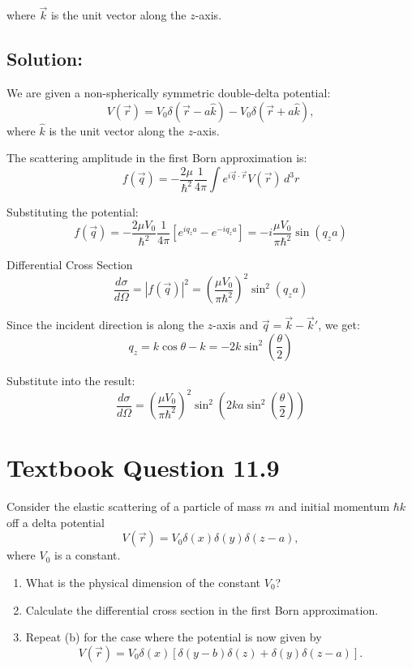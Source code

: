 \documentclass[12pt]{article}
\begin{document}
    where \( \vec{k} \) is the unit vector along the \( z \)-axis.

    \subsection{Solution:}
        We are given a non-spherically symmetric double-delta potential:
        \[
            V(\vec{r}) = V_0 \delta(\vec{r} - a \hat{k}) - V_0 \delta(\vec{r} + a \hat{k}),
        \]
        where \( \hat{k} \) is the unit vector along the \( z \)-axis.
        
        The scattering amplitude in the first Born approximation is:
        \[
            f(\vec{q}) = -\frac{2\mu}{\hbar^2} \frac{1}{4\pi} \int e^{i \vec{q} \cdot \vec{r}} V(\vec{r}) \, d^3r
        \]
        
        Substituting the potential:
        \[
            f(\vec{q}) = -\frac{2\mu V_0}{\hbar^2} \frac{1}{4\pi} \left[ e^{i q_z a} - e^{-i q_z a} \right]
            = -i \frac{\mu V_0}{\pi \hbar^2} \sin(q_z a)
        \]
        
        Differential Cross Section
        \[
            \frac{d\sigma}{d\Omega} = |f(\vec{q})|^2 = \left( \frac{\mu V_0}{\pi \hbar^2} \right)^2 \sin^2(q_z a)
        \]
        
        Since the incident direction is along the \( z \)-axis and \( \vec{q} = \vec{k} - \vec{k}' \), we get:
        \[
            q_z = k \cos\theta - k = -2k \sin^2\left( \frac{\theta}{2} \right)
        \]
        
        Substitute into the result:
        \[
            \boxed{
            \frac{d\sigma}{d\Omega} = \left( \frac{\mu V_0}{\pi \hbar^2} \right)^2 \sin^2\left( 2ka \sin^2\left( \frac{\theta}{2} \right) \right)        }
        \]

\section{Textbook Question 11.9}
    Consider the elastic scattering of a particle of mass \( m \) and initial momentum \( \hbar k \) off a delta potential 
    \[
        V(\vec{r}) = V_0 \delta(x) \delta(y) \delta(z - a),
    \]
    where \( V_0 \) is a constant.
    
    \begin{enumerate}
        \item[(a)] What is the physical dimension of the constant \( V_0 \)?
        \item[(b)] Calculate the differential cross section in the first Born approximation.
        \item[(c)] Repeat (b) for the case where the potential is now given by
        \[
        V(\vec{r}) = V_0 \delta(x) \left[ \delta(y - b)\delta(z) + \delta(y)\delta(z - a) \right].
        \]
    \end{enumerate}
\end{document}
